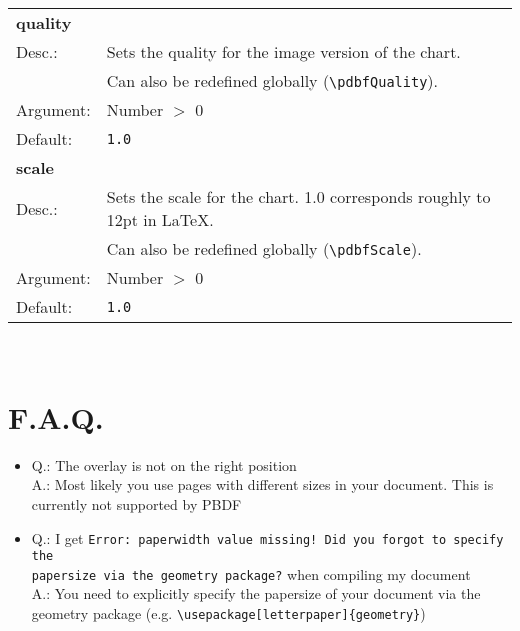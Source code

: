 \documentclass[11pt]{scrartcl}
\begin{document}
\begin{tabular}{ll}
\textbf{quality} \\
Desc.:	&	Sets the quality for the image version of the chart. \\
& Can also be redefined globally (\verb|\pdbfQuality|). \\
Argument:	&Number $>$ 0 \\
Default:&	\verb|1.0| \\[4pt]

\textbf{scale} \\
Desc.:	&	Sets the scale for the chart. 1.0 corresponds roughly to 12pt in \LaTeX. \\
& Can also be redefined globally (\verb|\pdbfScale|). \\
Argument:	&Number $>$ 0 \\
Default:&	\verb|1.0| \\[4pt]

\end{tabular} \\

\newpage
\section{F.A.Q.}
\begin{itemize}
\item Q.: The overlay is not on the right position \\
A.: Most likely you use pages with different sizes in your document. This is currently not supported by PBDF 
\item Q.: I get \verb|Error: paperwidth value missing! Did you forgot to specify the| \\ \verb|papersize via the geometry package?| when compiling my document \\
A.: You need to explicitly specify the papersize of your document via the geometry package (e.g. \verb|\usepackage[letterpaper]{geometry}|)
\end{itemize}
\end{document}
